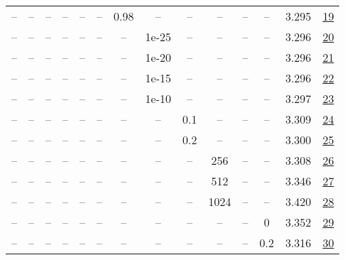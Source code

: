 \begin{table}[H]
\begin{tabular}{cccccccccccccc}
-- & -- & -- & -- & -- & -- & 0.98 & -- & -- & -- & -- & -- & 3.295 & \href{https://wandb.ai/stanford-mercury/optimizer-scaling/runs/sweep-130m-10B-muonzf7964alr0.008-wd0.1-minlr0-warmup0-b10.8-b20-a9a044}{19} \\
-- & -- & -- & -- & -- & -- & -- & 1e-25 & -- & -- & -- & -- & 3.296 & \href{https://wandb.ai/stanford-mercury/optimizer-scaling/runs/sweep-130m-10B-muonzecb6c8lr0.008-wd0.1-minlr0-warmup0-b10.8-b20-bc0c88}{20} \\
-- & -- & -- & -- & -- & -- & -- & 1e-20 & -- & -- & -- & -- & 3.296 & \href{https://wandb.ai/stanford-mercury/optimizer-scaling/runs/sweep-130m-10B-muonzf140a5lr0.008-wd0.1-minlr0-warmup0-b10.8-b20-21ccc0}{21} \\
-- & -- & -- & -- & -- & -- & -- & 1e-15 & -- & -- & -- & -- & 3.296 & \href{https://wandb.ai/stanford-mercury/optimizer-scaling/runs/sweep-130m-10B-muonz9d74d8lr0.008-wd0.1-minlr0-warmup0-b10.8-b20-76b637}{22} \\
-- & -- & -- & -- & -- & -- & -- & 1e-10 & -- & -- & -- & -- & 3.297 & \href{https://wandb.ai/stanford-mercury/optimizer-scaling/runs/sweep-130m-10B-muonzb8dbd0lr0.008-wd0.1-minlr0-warmup0-b10.8-b20-bf5bd6}{23} \\
-- & -- & -- & -- & -- & -- & -- & -- & 0.1 & -- & -- & -- & 3.309 & \href{https://wandb.ai/stanford-mercury/optimizer-scaling/runs/sweep-130m-10B-muonz2bd448lr0.008-wd0.1-minlr0-warmup0-b10.8-b20-9b764e}{24} \\
-- & -- & -- & -- & -- & -- & -- & -- & 0.2 & -- & -- & -- & 3.300 & \href{https://wandb.ai/stanford-mercury/optimizer-scaling/runs/sweep-130m-10B-muonz68f5fdlr0.008-wd0.1-minlr0-warmup0-b10.8-b20-1395fd}{25} \\
-- & -- & -- & -- & -- & -- & -- & -- & -- & 256 & -- & -- & 3.308 & \href{https://wandb.ai/stanford-mercury/optimizer-scaling/runs/sweep-130m-10B-muonz4d5315lr0.008-wd0.1-minlr0-warmup0-b10.8-b20-64c74e}{26} \\
-- & -- & -- & -- & -- & -- & -- & -- & -- & 512 & -- & -- & 3.346 & \href{https://wandb.ai/stanford-mercury/optimizer-scaling/runs/sweep-130m-10B-muonze4b457lr0.008-wd0.1-minlr0-warmup0-b10.8-b20-4b4ebe}{27} \\
-- & -- & -- & -- & -- & -- & -- & -- & -- & 1024 & -- & -- & 3.420 & \href{https://wandb.ai/stanford-mercury/optimizer-scaling/runs/sweep-130m-10B-muonz35bd41lr0.008-wd0.1-minlr0-warmup0-b10.8-b20-57a098}{28} \\
-- & -- & -- & -- & -- & -- & -- & -- & -- & -- & -- & 0 & 3.352 & \href{https://wandb.ai/stanford-mercury/optimizer-scaling/runs/sweep-130m-10B-muonvbf1cfdlr0.008-wd0-minlr0-warmup0-b10.8-b20.9-ea634f}{29} \\
-- & -- & -- & -- & -- & -- & -- & -- & -- & -- & -- & 0.2 & 3.316 & \href{https://wandb.ai/stanford-mercury/optimizer-scaling/runs/sweep-130m-10B-muonzf7d090lr0.008-wd0.2-minlr0-warmup0-b10.8-b20-05f51f}{30} \\
\bottomrule
\end{tabular}
\end{table}

